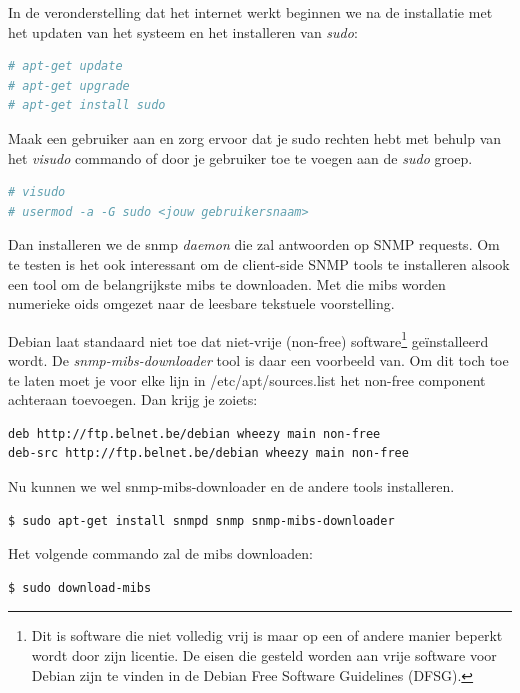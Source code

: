 In de veronderstelling dat het internet werkt beginnen we na de installatie met het updaten van het systeem en het installeren van \textit{sudo}:

\begin{lstlisting}[language=bash]
# apt-get update
# apt-get upgrade
# apt-get install sudo
\end{lstlisting}

Maak een gebruiker aan en zorg ervoor dat je sudo rechten hebt met behulp van het \textit{visudo} commando of door je gebruiker toe te voegen aan de \textit{sudo} groep.

\begin{lstlisting}[language=bash]
# visudo
# usermod -a -G sudo <jouw gebruikersnaam>
\end{lstlisting}

Dan installeren we de snmp \textit{daemon} die zal antwoorden op SNMP requests.
Om te testen is het ook interessant om de client-side SNMP tools te installeren alsook een tool om de belangrijkste \glspl{mib} te downloaden.
Met die \glspl{mib} worden numerieke \glspl{oid} omgezet naar de leesbare tekstuele voorstelling.

Debian laat standaard niet toe dat niet-vrije (non-free) software\footnote{
	Dit is software die niet volledig vrij is maar op een of andere manier beperkt wordt door zijn licentie. De eisen die gesteld worden aan vrije software voor Debian zijn te vinden in de Debian Free Software Guidelines (DFSG)\cite{dfsg}\cite{dfsg-wiki}.}
geïnstalleerd wordt. De \textit{snmp-mibs-downloader} tool is daar een voorbeeld van.
Om dit toch toe te laten moet je voor elke lijn in /etc/apt/sources.list het non-free component achteraan toevoegen.
Dan krijg je zoiets:

\begin{lstlisting}[language=bash]
deb http://ftp.belnet.be/debian wheezy main non-free
deb-src http://ftp.belnet.be/debian wheezy main non-free
\end{lstlisting}

Nu kunnen we wel snmp-mibs-downloader en de andere tools installeren.

\begin{lstlisting}[language=bash]
$ sudo apt-get install snmpd snmp snmp-mibs-downloader
\end{lstlisting}

Het volgende commando zal de \glspl{mib} downloaden:

\begin{lstlisting}[language=bash]
$ sudo download-mibs
\end{lstlisting}

